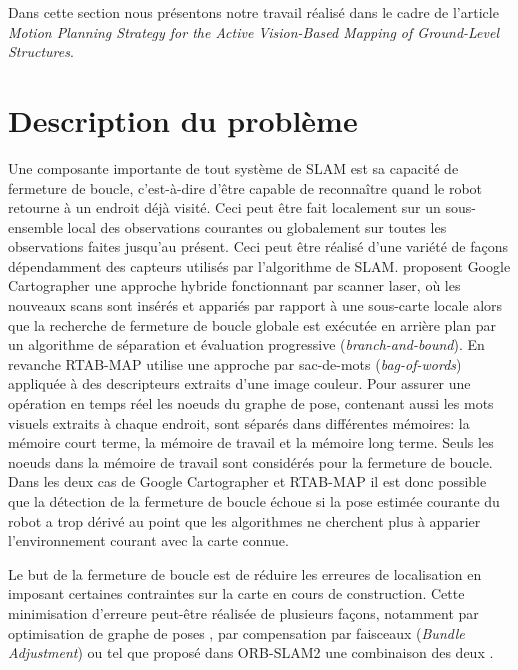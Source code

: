 \label{sec:ugv}

Dans cette section nous présentons notre travail réalisé dans le cadre de l'article \textit{Motion Planning Strategy for the Active Vision-Based Mapping of Ground-Level Structures}.

\section{Description du problème}
Une composante importante de tout système de SLAM est sa capacité de fermeture de boucle, c'est-à-dire d'être capable de reconnaître quand le robot retourne à un endroit déjà visité. Ceci peut être fait localement sur un sous-ensemble local des observations courantes ou globalement sur toutes les observations faites jusqu'au présent. Ceci peut être réalisé d'une variété de façons dépendamment des capteurs utilisés par l'algorithme de SLAM. \citep{Hess2016} proposent Google Cartographer une approche hybride fonctionnant par scanner laser, où les nouveaux scans sont insérés et appariés par rapport à une sous-carte locale alors que la recherche de fermeture de boucle globale est exécutée en arrière plan par un algorithme de séparation et évaluation progressive (\textit{branch-and-bound}). En revanche RTAB-MAP \citep{Labbe2014} utilise une approche par sac-de-mots (\textit{bag-of-words}) appliquée à des descripteurs extraits d'une image couleur. Pour assurer une opération en temps réel les noeuds du graphe de pose, contenant aussi les mots visuels extraits à chaque endroit, sont séparés dans différentes mémoires: la mémoire court terme, la mémoire de travail et la mémoire long terme. Seuls les noeuds dans la mémoire de travail sont considérés pour la fermeture de boucle. Dans les deux cas de Google Cartographer et RTAB-MAP il est donc possible que la détection de la fermeture de boucle échoue si la pose estimée courante du robot a trop dérivé au point que les algorithmes ne cherchent plus à apparier l'environnement courant avec la carte connue.

Le but de la fermeture de boucle est de réduire les erreures de localisation en imposant certaines contraintes sur la carte en cours de construction. Cette minimisation d'erreure peut-être réalisée de plusieurs façons, notamment par optimisation de graphe de poses \citep{Carlone2016}, par compensation par faisceaux (\textit{Bundle Adjustment}) \citep{Mei2011} ou tel que proposé dans ORB-SLAM2 une combinaison des deux \citep{Mur-Artal2017}.

